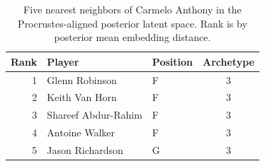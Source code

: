 \begin{table}[htbp]
  \centering\small
  \begin{tabular}{rllc}
    \toprule
    Rank & Player & Position & Archetype \\
    \midrule
    1 & Glenn Robinson & F & 3 \\
    2 & Keith Van Horn & F & 3 \\
    3 & Shareef Abdur-Rahim & F & 3 \\
    4 & Antoine Walker & F & 3 \\
    5 & Jason Richardson & G & 3 \\
    \bottomrule
  \end{tabular}
  \caption{Five nearest neighbors of Carmelo Anthony in the Procrustes-aligned posterior latent space. Rank is by posterior mean embedding distance.}
  \label{tab:Carmelo_Anthony_neighbors}
\end{table}


